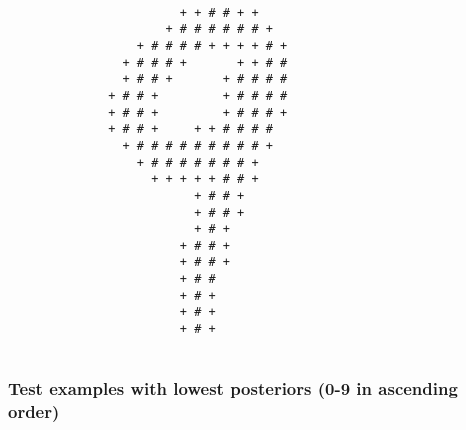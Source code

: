 \begin{multicols*}{2}
\begin{Verbatim}[samepage=true]
                                                        
\end{Verbatim}
\begin{Verbatim}[samepage=true]
                                                        
                                                        
                                                        
                        + + # # + +                     
                      + # # # # # # +                   
                  + # # # # + + + + # +                 
                + # # # +       + + # #                 
                + # # +       + # # # #                 
              + # # +         + # # # #                 
              + # # +         + # # # +                 
              + # # +     + + # # # #                   
                + # # # # # # # # # +                   
                  + # # # # # # # +                     
                    + + + + + # # +                     
                          + # # +                       
                          + # # +                       
                          + # +                         
                        + # # +                         
                        + # # +                         
                        + # #                           
                        + # +                           
                        + # +                           
                        + # +                           
                                                        
\end{Verbatim}

\subsubsection{Test examples with lowest posteriors (0-9 in ascending order)}
\begin{Verbatim}[samepage=true]
                                                        

\end{Verbatim}
\end{multicols*}
